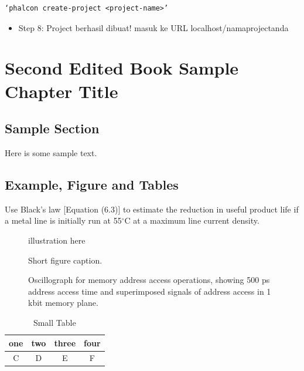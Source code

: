 \documentclass{wileySix}
\begin{document}
\begin{lstlisting}[caption={Command untuk cara menambah project baru},label={lst:newproject}]
‘phalcon create-project <project-name>’
\end{lstlisting}
 \begin{itemize}
 \item Step 8: Project berhasil dibuat! masuk ke URL localhost/namaprojectanda
 \end{itemize}


\chapter{Second Edited Book Sample Chapter Title}

\section{Sample Section}
Here is some sample text.

\newpage

\section{Example, Figure and Tables}
\vskip6pt
\begin{example}
Use Black's law [Equation (6.3)] to estimate the reduction in useful product
life if a metal line is initially run at 55$^\circ$C at a maximum line
current density.
\end{example}




\begin{figure}[ht]
illustration here
\caption{Short figure caption.}
\end{figure}

\begin{figure}[ht]
\vskip2pt
\caption{Oscillograph for  memory address access operations,
showing 500 ps
address access time and superimposed signals
of address access in 1 kbit
memory plane.}
\end{figure}

\begin{table}[ht]
\caption{Small Table}
\centering
\begin{tabular}{cccc}
\hline
one&two&three&four\\
\hline
C&D&E&F\\
\hline
\end{tabular}
\end{table}
\end{document}

